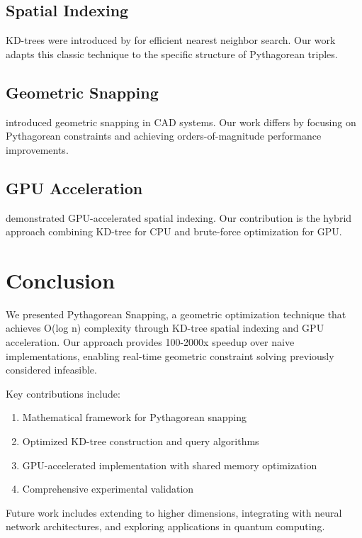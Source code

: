 \documentclass{article}
\begin{document}
\subsection{Spatial Indexing}

KD-trees were introduced by \citet{bentley1975} for efficient nearest neighbor search. Our work adapts this classic technique to the specific structure of Pythagorean triples.

\subsection{Geometric Snapping}

\citet{snap1998} introduced geometric snapping in CAD systems. Our work differs by focusing on Pythagorean constraints and achieving orders-of-magnitude performance improvements.

\subsection{GPU Acceleration}

\citet{gpu2009} demonstrated GPU-accelerated spatial indexing. Our contribution is the hybrid approach combining KD-tree for CPU and brute-force optimization for GPU.

\section{Conclusion}

We presented Pythagorean Snapping, a geometric optimization technique that achieves O(log n) complexity through KD-tree spatial indexing and GPU acceleration. Our approach provides 100-2000x speedup over naive implementations, enabling real-time geometric constraint solving previously considered infeasible.

Key contributions include:
\begin{enumerate}
    \item Mathematical framework for Pythagorean snapping
    \item Optimized KD-tree construction and query algorithms
    \item GPU-accelerated implementation with shared memory optimization
    \item Comprehensive experimental validation
\end{enumerate}

Future work includes extending to higher dimensions, integrating with neural network architectures, and exploring applications in quantum computing.
\end{document}
